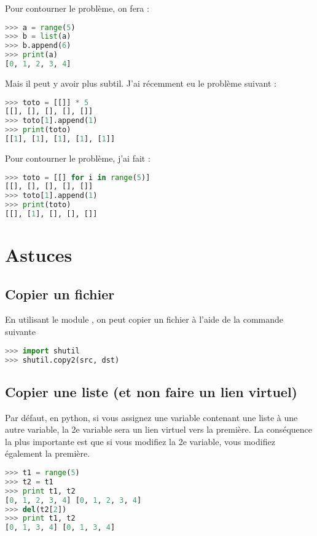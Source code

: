 \documentclass[a4paper,twoside]{article}
\begin{document}
Pour contourner le problème, on fera :
\begin{lstlisting}[language=python]
>>> a = range(5)
>>> b = list(a)
>>> b.append(6)
>>> print(a)
[0, 1, 2, 3, 4]
\end{lstlisting}

\bigskip

Mais il peut y avoir plus subtil. J'ai récemment eu le problème suivant :
\begin{lstlisting}[language=python]
>>> toto = [[]] * 5
[[], [], [], [], []]
>>> toto[1].append(1)
>>> print(toto)
[[1], [1], [1], [1], [1]]
\end{lstlisting}

Pour contourner le problème, j'ai fait :
\begin{lstlisting}[language=python]
>>> toto = [[] for i in range(5)]
[[], [], [], [], []]
>>> toto[1].append(1)
>>> print(toto)
[[], [1], [], [], []]
\end{lstlisting}

\section{Astuces}
\subsection{Copier un fichier}
En utilisant le module , on peut copier un fichier à l'aide de la commande suivante 
\begin{lstlisting}[language=python]
>>> import shutil
>>> shutil.copy2(src, dst)
\end{lstlisting}

\subsection{Copier une liste (et non faire un lien virtuel)}
Par défaut, en python, si vous assignez une variable contenant une liste à une autre variable, la 2e variable sera un lien virtuel vers la première. La conséquence la plus importante est que si vous modifiez la 2e variable, vous modifiez également la première.

\begin{exemple}
\begin{lstlisting}[language=python]
>>> t1 = range(5)
>>> t2 = t1
>>> print t1, t2
[0, 1, 2, 3, 4] [0, 1, 2, 3, 4]
>>> del(t2[2])
>>> print t1, t2
[0, 1, 3, 4] [0, 1, 3, 4]
\end{lstlisting}
\end{exemple}
\end{document}
